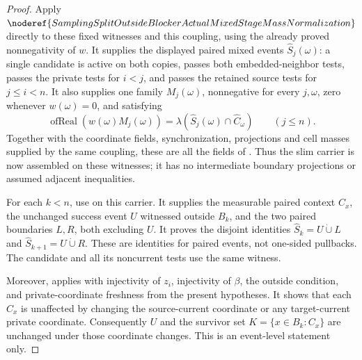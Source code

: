 \begin{proof}
Apply
\(\noderef{SamplingSplitOutsideBlockerActualMixedStageMassNormalization}\)
directly to these fixed witnesses and this coupling, using the already proved
nonnegativity of \(w\).  It supplies the displayed paired mixed events
\(\widehat S_j(\omega)\): a single candidate is active on both copies,
passes both embedded-neighbor tests, passes the private tests for \(i<j\),
and passes the retained source tests for \(j\le i<n\).  It also supplies one
family \(M_j(\omega)\), nonnegative for every \(j,\omega\), zero whenever
\(w(\omega)=0\), and satisfying
\[
 \operatorname{ofReal}(w(\omega)M_j(\omega))
 =\lambda(\widehat S_j(\omega)\cap\widehat C_\omega)
 \qquad(j\le n).
\]
Together with the coordinate fields, synchronization, projections and cell
masses supplied by the same coupling, these are all the fields of
.
Thus the slim carrier is now assembled on these witnesses; it has no
intermediate boundary projections or assumed adjacent inequalities.

For each \(k<n\), use
on this carrier. It supplies the measurable paired context \(C_x\), the
unchanged success event \(U\) witnessed outside \(B_k\), and the two paired
boundaries \(L,R\), both excluding \(U\). It proves the disjoint identities
\(\widehat S_k=U\mathbin{\dot\cup}L\) and
\(\widehat S_{k+1}=U\mathbin{\dot\cup}R\).
These are identities for paired events, not one-sided pullbacks.
The candidate and all its noncurrent tests use the same witness.

Moreover,
applies with injectivity of \(z_i\), injectivity of \(\beta\), the outside
condition, and private-coordinate freshness from the present hypotheses.
It shows that each \(C_x\) is unaffected by changing the source-current
coordinate or any target-current private coordinate. Consequently \(U\)
and the survivor set \(K=\{x\in B_k:C_x\}\) are unchanged under those
coordinate changes. This is an event-level statement only.


\end{proof}
